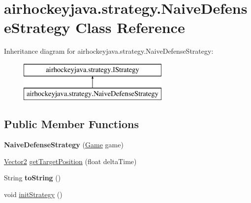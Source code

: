 \hypertarget{classairhockeyjava_1_1strategy_1_1_naive_defense_strategy}{}\section{airhockeyjava.\+strategy.\+Naive\+Defense\+Strategy Class Reference}
\label{classairhockeyjava_1_1strategy_1_1_naive_defense_strategy}
Inheritance diagram for airhockeyjava.\+strategy.\+Naive\+Defense\+Strategy\+:\begin{figure}[H]
\begin{center}
\leavevmode
\includegraphics[height=2.000000cm]{classairhockeyjava_1_1strategy_1_1_naive_defense_strategy}
\end{center}
\end{figure}
\subsection*{Public Member Functions}
\begin{DoxyCompactItemize}
\item 
\hypertarget{classairhockeyjava_1_1strategy_1_1_naive_defense_strategy_af6da9987d44f3d3d90edc085d1f2fb09}{}{\bfseries Naive\+Defense\+Strategy} (\hyperlink{classairhockeyjava_1_1game_1_1_game}{Game} game)\label{classairhockeyjava_1_1strategy_1_1_naive_defense_strategy_af6da9987d44f3d3d90edc085d1f2fb09}

\item 
\hyperlink{classairhockeyjava_1_1util_1_1_vector2}{Vector2} \hyperlink{classairhockeyjava_1_1strategy_1_1_naive_defense_strategy_abe8ef1ed46c46a428016cabe178f9d33}{get\+Target\+Position} (float delta\+Time)
\item 
\hypertarget{classairhockeyjava_1_1strategy_1_1_naive_defense_strategy_aeadc7efaa1cbb502c5f1bb90e65a651f}{}String {\bfseries to\+String} ()\label{classairhockeyjava_1_1strategy_1_1_naive_defense_strategy_aeadc7efaa1cbb502c5f1bb90e65a651f}

\item 
void \hyperlink{classairhockeyjava_1_1strategy_1_1_naive_defense_strategy_aa6f905456fdf94c934c37b3a7d09d857}{init\+Strategy} ()
\end{DoxyCompactItemize}


